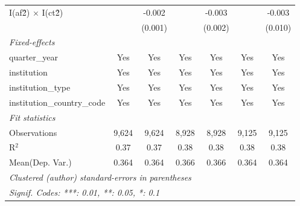 \begin{tabular}{lcccccc}
   I(af\^2) $\times$ I(ct\^2)         &               & -0.002         &               & -0.003         &               & -0.003\\   
                                      &               & (0.001)        &               & (0.002)        &               & (0.010)\\   
   \midrule
   \emph{Fixed-effects}\\
   quarter\_year                      & Yes           & Yes            & Yes           & Yes            & Yes           & Yes\\  
   institution                        & Yes           & Yes            & Yes           & Yes            & Yes           & Yes\\  
   institution\_type                  & Yes           & Yes            & Yes           & Yes            & Yes           & Yes\\  
   institution\_country\_code         & Yes           & Yes            & Yes           & Yes            & Yes           & Yes\\  
   \midrule
   \emph{Fit statistics}\\
   Observations                       & 9,624         & 9,624          & 8,928         & 8,928          & 9,125         & 9,125\\  
   R$^2$                              & 0.37          & 0.37           & 0.38          & 0.38           & 0.38          & 0.38\\  
Mean(Dep. Var.) & 0.364 & 0.364 & 0.366 & 0.366 & 0.364 & 0.364 \\
   \midrule \midrule
   \multicolumn{7}{l}{\emph{Clustered (author) standard-errors in parentheses}}\\
   \multicolumn{7}{l}{\emph{Signif. Codes: ***: 0.01, **: 0.05, *: 0.1}}\\
\end{tabular}
\par\endgroup
